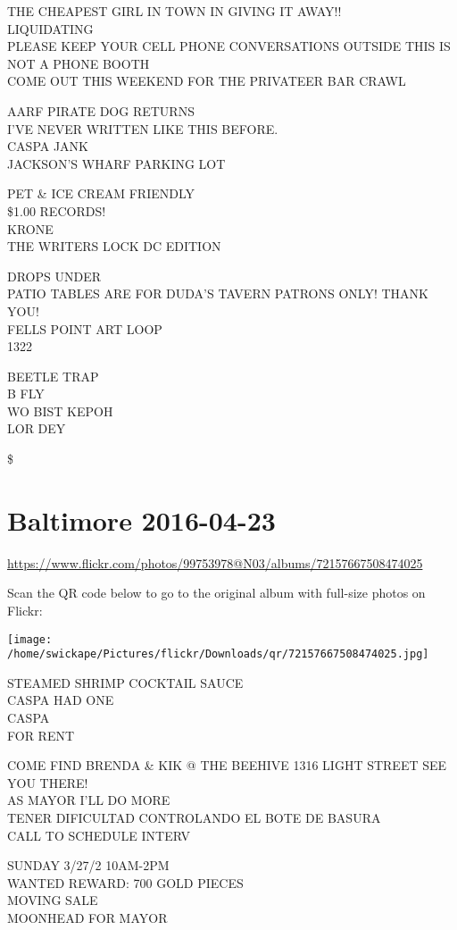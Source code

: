 \documentclass[10pt,letterpaper]{article}
\begin{document}
THE CHEAPEST GIRL IN TOWN IN GIVING IT AWAY!!\\
LIQUIDATING\\
PLEASE KEEP YOUR CELL PHONE CONVERSATIONS OUTSIDE THIS IS NOT A PHONE BOOTH\\
COME OUT THIS WEEKEND FOR THE PRIVATEER BAR CRAWL

AARF PIRATE DOG RETURNS\\
I'VE NEVER WRITTEN LIKE THIS BEFORE.\\
CASPA JANK\\
JACKSON'S WHARF PARKING LOT

PET \& ICE CREAM FRIENDLY\\
\$1.00 RECORDS!\\
KRONE\\
THE WRITERS LOCK DC EDITION

DROPS UNDER\\
PATIO TABLES ARE FOR DUDA'S TAVERN PATRONS ONLY!  THANK YOU!\\
FELLS POINT ART LOOP\\
1322

BEETLE TRAP\\
B FLY\\
WO BIST KEPOH\\
LOR DEY

\$


\section*{Baltimore 2016-04-23}

\url{https://www.flickr.com/photos/99753978@N03/albums/72157667508474025}

Scan the QR code below to go to the original album with full-size photos on Flickr:

\texttt{[image: /home/swickape/Pictures/flickr/Downloads/qr/72157667508474025.jpg]}


STEAMED SHRIMP COCKTAIL SAUCE\\
CASPA HAD ONE\\
CASPA\\
FOR RENT

COME FIND BRENDA \& KIK @ THE BEEHIVE 1316 LIGHT STREET SEE YOU THERE!\\
AS MAYOR I'LL DO MORE\\
TENER DIFICULTAD CONTROLANDO EL BOTE DE BASURA\\
CALL TO SCHEDULE INTERV

SUNDAY 3/27/2 10AM{-}2PM\\
WANTED REWARD: 700 GOLD PIECES\\
MOVING SALE\\
MOONHEAD FOR MAYOR
\end{document}
